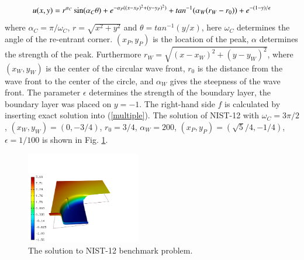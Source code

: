 \documentclass[12pt]{elsarticle}
\begin{document}
\[
u(x,y) =  r^{\alpha_{C} }\sin(\alpha_{C} \theta)
+ e^{-\alpha_{P} ((x - x_{P})^{2} + (y - y_{P})^{2})}
+ tan^{-1}(\alpha_{W} (r_{W} - r_{0})) \\
+ e^{-(1 - y) / \epsilon}
\]
where $\alpha_C = \pi / \omega_C$, $r = \sqrt{x^2+y^2}$
and $\theta = tan^{-1}(y/x)$, here $\omega_C$ determines
the angle of the re-entrant corner.
$(x_{P}, y_{P})$ is the location of the peak, $\alpha$
determines the strength of the peak. Furthermore
$r_{W} = \sqrt{(x - x_{W})^{2} + (y - y_{W})^{2}}$,
where $(x_{W}, y_{W})$ is the center of the circular wave front,
$r_{0}$ is the distance from the wave front to the
center of the circle, and $\alpha_W$ gives
the steepness of the wave front. The parameter $\epsilon$ determines the
strength of the boundary layer, the boundary layer was placed on $y = -1$.
The right-hand side $f$ is calculated by inserting exact solution into (\ref{multiple}).
The solution of NIST-12 with $\omega_C = 3 \pi /2$,
$(x_{W}, y_{W}) = (0, -3/4)$, $r_{0} = 3/4$, $\alpha_{W} = 200$,
$(x_{P}, y_{P}) = (\sqrt{5} / 4, -1/4)$,
$\epsilon = 1/100$ is shown in Fig. \ref{fig:sln-nist12}.

\begin{figure}[!ht]
\centering
\includegraphics[height=4cm]{nist/nist-12/solution.png}
\caption{The solution to NIST-12 benchmark problem.}
\label{fig:sln-nist12}
\end{figure}
\end{document}
